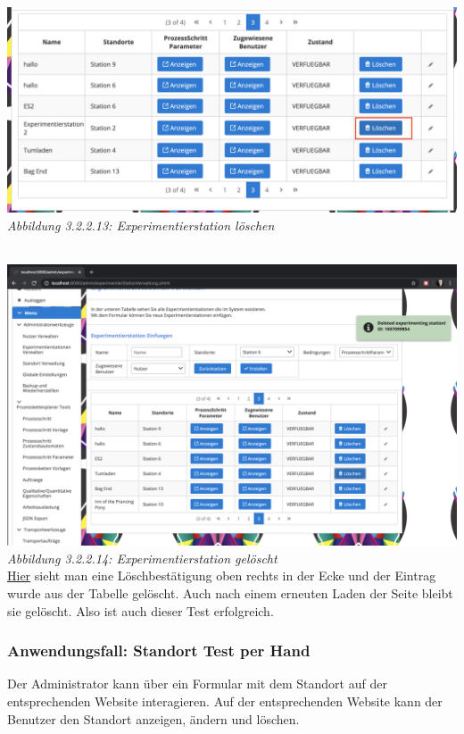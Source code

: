 \documentclass[enabledeprecatedfontcommands,fontsize=12pt,paper=a4,twoside]{scrartcl}
\begin{document}
\hypertarget{sc3.1.3.13}{
\includegraphics[width=1\textwidth]{Screenshots/31313.png}
\textit{Abbildung 3.2.2.13: Experimentierstation löschen}
} \\

\hypertarget{sc3.1.3.14}{
\includegraphics[width=1\textwidth]{Screenshots/31314.png}
\textit{Abbildung 3.2.2.14: Experimentierstation gelöscht}
} \\

\hyperlink{sc3.1.3.14}{Hier} sieht man eine Löschbestätigung oben rechts in der Ecke und der Eintrag wurde aus der Tabelle gelöscht. Auch nach einem erneuten Laden der Seite bleibt sie gelöscht. Also ist auch dieser Test erfolgreich. 


\subsubsection{Anwendungsfall: Standort Test per Hand}

Der Administrator kann über ein Formular mit dem Standort auf der entsprechenden Website interagieren. Auf der entsprechenden Website kann der Benutzer den Standort anzeigen, ändern und löschen.\\
\end{document}
